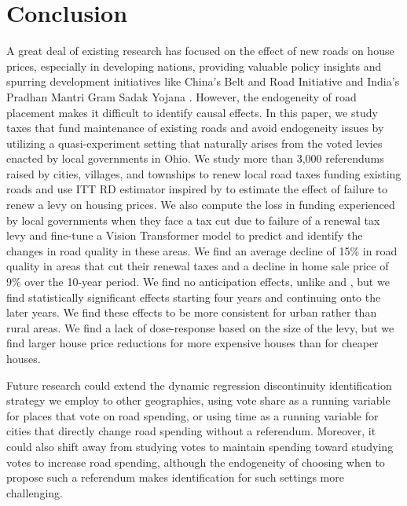\section{Conclusion} \label{sec:conclusion}

A great deal of existing research has focused on the effect of new roads on house prices, especially in developing nations, providing valuable policy insights and spurring development initiatives like China’s Belt \citep{huang2016understanding} and Road Initiative and India’s Pradhan Mantri Gram Sadak Yojana \citep{asher2020}. However, the endogeneity of road placement makes it difficult to identify causal effects. In this paper, we study taxes that fund maintenance of existing roads and avoid endogeneity issues by utilizing a quasi-experiment setting that naturally arises from the voted levies enacted by local governments in Ohio. We study more than 3,000 referendums raised by cities, villages, and townships to renew local road taxes funding existing roads and use ITT RD estimator inspired by \cite{cellini2010value} to estimate the effect of failure to renew a levy on housing prices. We also compute the loss in funding experienced by local governments when they face a tax cut due to failure of a renewal tax levy and fine-tune a Vision Transformer model to predict and identify the changes in road quality in these areas. We find an average decline of 15\% in road quality in areas that cut their renewal taxes and a decline in home sale price of 9\% over the 10-year period. We find no anticipation effects, unlike \cite{beenstock2016hedonic} and \cite{diao2017spatial}, but we find statistically significant effects starting four years and continuing onto the later years. We find these effects to be more consistent for urban rather than rural areas. We find a lack of dose-response based on the size of the levy, but we find larger house price reductions for more expensive houses than for cheaper houses.  

\noindent Future research could extend the dynamic regression discontinuity identification strategy we employ to other geographies, using vote share as a running variable for places that vote on road spending, or using time as a running variable for cities that directly change road spending without a referendum. Moreover, it could also shift away from studying votes to maintain spending toward studying votes to increase road spending, although the endogeneity of choosing when to propose such a referendum makes identification for such settings more challenging.


